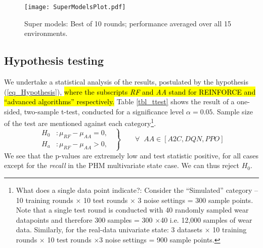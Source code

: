 \documentclass[referee, sn-mathphys-num]{sn-jnl}
\newcommand{\hlc}[2][cyan!17]{{\colorlet{foo}{#1}\sethlcolor{foo}\hl{#2}}}
\begin{document}
	\begin{figure}[htb]
		\centering
		\texttt{[image: SuperModelsPlot.pdf]}  
		\caption{Super models: Best of 10 rounds; performance averaged over all 15 environments.}
		\label{fig_supermodels}
	\end{figure}
	
	\subsection{Hypothesis testing}\label{sec_Hypothesistesting}
	We undertake a statistical analysis of the results, postulated by the hypothesis (\ref{eq_Hypothesis}), \hlc{where the subscripts \textit{RF} and \textit{AA} stand for REINFORCE and ``advanced algorithms'' respectively.} Table \ref{tbl_ttest} shows the result of a one-sided, two-sample t-test, conducted for a significance level $\alpha=0.05$. Sample size of the test are mentioned against each category\footnote{What does a single data point indicate?: Consider the ``Simulated'' category -- 10 training rounds $\times$ 10 test rounds $\times$ 3 noise settings = 300 sample points. Note that a single test round is conducted with 40 randomly sampled wear datapoints and therefore 300 samples = 300 $\times$40 i.e. 12,000 samples of wear data. Similarly, for the real-data univariate state: 3 datasets $\times$ 10 training rounds $\times$ 10 test rounds $\times$3 noise settings = 900 sample points.}.
	\begin{equation}
		\left.\begin{aligned}
			H_0 & : \mu_{RF} - \mu_{AA} = 0,\;\; \\
			H_a & : \mu_{RF} - \mu_{AA} > 0, \;\;
		\end{aligned}
		\right\}
		\qquad \forall \;\; \text{$AA \in[A2C, DQN, PPO]$}
		\label{eq_Hypothesis}
	\end{equation}
	We see that the p-values are extremely low and test statistic positive, for all cases except for the \textit{recall} in the PHM multivariate state case. We can thus reject $H_0$.
\end{document}
